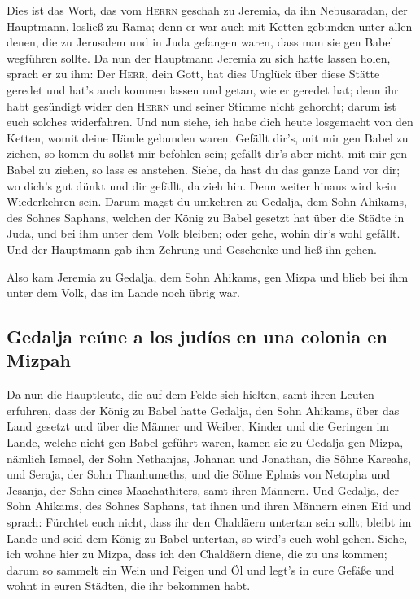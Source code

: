  Dies ist das Wort, das vom \textsc{Herrn} geschah zu
Jeremia, da ihn Nebusaradan, der Hauptmann, losließ zu Rama; denn er war
auch mit Ketten gebunden unter allen denen, die zu Jerusalem und in Juda
gefangen waren, dass man sie gen Babel wegführen sollte. 
Da nun der Hauptmann Jeremia zu sich hatte lassen holen, sprach er zu
ihm: Der \textsc{Herr}, dein Gott, hat dies Unglück über diese Stätte
geredet  und hat's auch kommen lassen und getan, wie er
geredet hat; denn ihr habt gesündigt wider den \textsc{Herrn} und seiner
Stimme nicht gehorcht; darum ist euch solches widerfahren.
 Und nun siehe, ich habe dich heute losgemacht von den
Ketten, womit deine Hände gebunden waren. Gefällt dir's, mit mir gen
Babel zu ziehen, so komm du sollst mir befohlen sein; gefällt dir's aber
nicht, mit mir gen Babel zu ziehen, so lass es anstehen. Siehe, da hast
du das ganze Land vor dir; wo dich's gut dünkt und dir gefällt, da zieh
hin.  Denn weiter hinaus wird kein Wiederkehren sein.
Darum magst du umkehren zu Gedalja, dem Sohn Ahikams, des Sohnes
Saphans, welchen der König zu Babel gesetzt hat über die Städte in Juda,
und bei ihm unter dem Volk bleiben; oder gehe, wohin dir's wohl gefällt.
Und der Hauptmann gab ihm Zehrung und Geschenke und ließ ihn gehen.

 Also kam Jeremia zu Gedalja, dem Sohn Ahikams, gen Mizpa
und blieb bei ihm unter dem Volk, das im Lande noch übrig war.

\hypertarget{gedalja-reuxfane-a-los-juduxedos-en-una-colonia-en-mizpah}{%
\subsection{Gedalja reúne a los judíos en una colonia en
Mizpah}\label{gedalja-reuxfane-a-los-juduxedos-en-una-colonia-en-mizpah}}

 Da nun die Hauptleute, die auf dem Felde sich hielten,
samt ihren Leuten erfuhren, dass der König zu Babel hatte Gedalja, den
Sohn Ahikams, über das Land gesetzt und über die Männer und Weiber,
Kinder und die Geringen im Lande, welche nicht gen Babel geführt waren,
 kamen sie zu Gedalja gen Mizpa, nämlich Ismael, der Sohn
Nethanjas, Johanan und Jonathan, die Söhne Kareahs, und Seraja, der Sohn
Thanhumeths, und die Söhne Ephais von Netopha und Jesanja, der Sohn
eines Maachathiters, samt ihren Männern.  Und Gedalja, der
Sohn Ahikams, des Sohnes Saphans, tat ihnen und ihren Männern einen Eid
und sprach: Fürchtet euch nicht, dass ihr den Chaldäern untertan sein
sollt; bleibt im Lande und seid dem König zu Babel untertan, so wird's
euch wohl gehen.  Siehe, ich wohne hier zu Mizpa, dass
ich den Chaldäern diene, die zu uns kommen; darum so sammelt ein Wein
und Feigen und Öl und legt's in eure Gefäße und wohnt in euren Städten,
die ihr bekommen habt.

